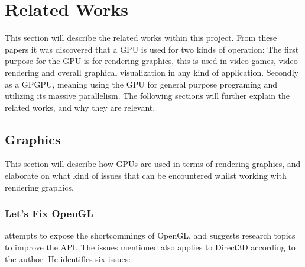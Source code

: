\section{Related Works}\label{sec:related_works}
\begin{sectionmeta}
This section will describe the related works within this project.
From these papers it was discovered that a \gls{GPU} is used for two kinds of operation: 
The first purpose for the \gls{GPU} is for rendering graphics, this is used in video games, video rendering and overall graphical visualization in any kind of application. 
Secondly as a GP\gls{GPU}, meaning using the \gls{GPU} for general purpose programing and utilizing its massive parallelism.
The following sections will further explain the related works, and why they are relevant.
\end{sectionmeta}

\subsection{Graphics}
This section will describe how \glspl{GPU} are used in terms of rendering graphics, and elaborate on what kind of issues that can be encountered whilst working with rendering graphics.

\vspace{1em}

\subsubsection{Let's Fix OpenGL}

\citet{fix_opengl} attempts to expose the shortcommings of OpenGL, and suggests research topics to improve the \gls{API}. 
The issues mentioned also applies to Direct3D according to the author. 
He identifies six issues: 

